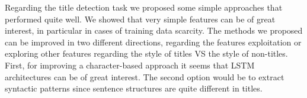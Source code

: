 Regarding the title detection task we proposed some simple approaches that performed quite well.
We showed that very simple features can be of great interest, in particular in cases of training data scarcity.
 The methods we proposed can be improved in two different directions, regarding the features exploitation or exploring other features regarding the style of titles VS the style of non-titles. First, for improving a character-based approach it seems that LSTM architectures can be of great interest. The second option would be to extract syntactic patterns since sentence structures are quite different in titles.
